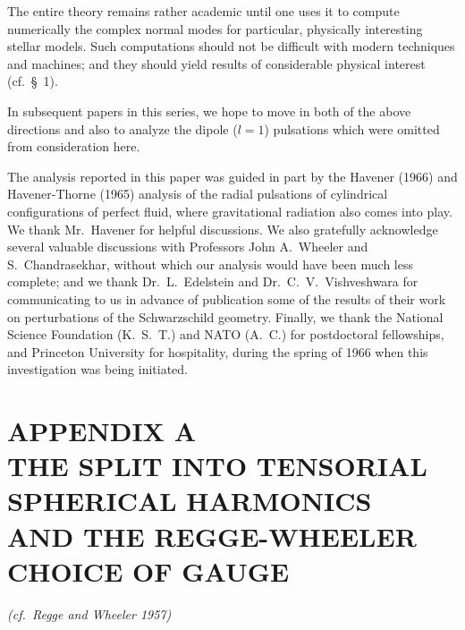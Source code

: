 
The entire theory remains rather academic until one uses it to compute numerically
the complex normal modes for particular, physically interesting stellar models. Such
computations should not be difficult with modern techniques and machines; and they
should yield results of considerable physical interest (cf.\ \S~1).

In subsequent papers in this series, we hope to move in both of the above directions
and also to analyze the dipole ($l = 1$) pulsations which were omitted from consideration
here.

The analysis reported in this paper was guided in part by the Havener (1966) and
Havener-Thorne (1965) analysis of the radial pulsations of cylindrical configurations of
perfect fluid, where gravitational radiation also comes into play. We thank Mr.\ Havener
for helpful discussions. We also gratefully acknowledge several valuable discussions with
Professors John A.\ Wheeler and S.\ Chandrasekhar, without which our analysis would
have been much less complete; and we thank Dr.\ L.\ Edelstein and Dr.\ C.\ V.\ Vishvesh\-wara
for communicating to us in advance of publication some of the results of their
work on perturbations of the Schwarzschild geometry. Finally, we thank the National
Science Foundation (K.\ S.\ T.) and NATO (A.\ C.) for postdoctoral fellowships, and
Princeton University for hospitality, during the spring of 1966 when this investigation
was being initiated.

\appendix

\section*{APPENDIX A \\ THE SPLIT INTO TENSORIAL SPHERICAL HARMONICS \\ AND THE REGGE-WHEELER CHOICE OF GAUGE}

\textit{(cf.\ Regge and Wheeler 1957)}

